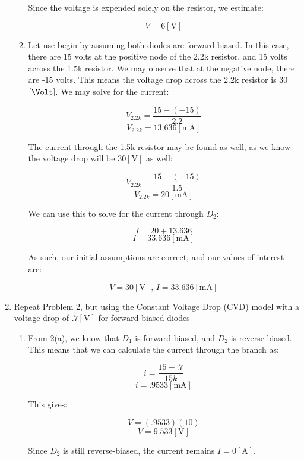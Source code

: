 \begin{enumerate}
\begin{enumerate}
        Since the voltage is expended solely on the resistor, we estimate:

        $$\boxed{V=6[\si{\volt}]}$$

      \item 
    
        Let use begin by assuming both diodes are forward-biased. In this case, there are 15 volts at the positive node of the 2.2k resistor, and 15 volts across the 1.5k resistor. We may observe that at the negative node, there are -15 volts. This means the voltage drop across the 2.2k resistor is 30$[\si{\Volt}]$. We may solve for the current:

        $$V_{2.2k}=\frac{15-(-15)}{2.2}$$
        $$V_{2.2k}=13.636[\si{\milli\ampere}]$$

        The current through the 1.5k resistor may be found as well, as we know the voltage drop will be $30[\si{\volt}]$ as well:

        $$V_{2.2k}=\frac{15-(-15)}{1.5}$$
        $$V_{2.2k}=20[\si{\milli\ampere}]$$

        We can use this to solve for the current through $D_2$:

        $$I=20+13.636$$
        $$I=33.636[\si{\milli\ampere}]$$

        As such, our initial assumptions are correct, and our values of interest are:

        $$\boxed{V=30[\si{\volt}],\,I=33.636[\si{\milli\ampere}]}$$

    \end{enumerate}

  \item Repeat Problem 2, but using the Constant Voltage Drop (CVD) model with a voltage drop of $.7[\si{\volt}]$ for forward-biased diodes

    \begin{enumerate}

      \item 

        From 2(a), we know that $D_1$ is forward-biased, and $D_2$ is reverse-biased. This means that we can calculate the current through the branch as:

        $$i=\frac{15-.7}{15k}$$
        $$i=.9533[\si{\milli\ampere}]$$

        This gives:

        $$V=(.9533)(10)$$
        $$\boxed{V=9.533[\si{\volt}]}$$

        Since $D_2$ is still reverse-biased, the current remains $\boxed{I=0[\si{\ampere}]}$.


\end{enumerate}
\end{enumerate}
